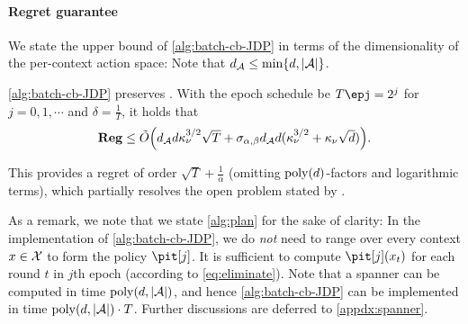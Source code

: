 



\paragraph{Regret guarantee}
We state the upper bound of \cref{alg:batch-cb-JDP} in terms of the dimensionality of the per-context action space: 
Note that $d_{\mathcal{A}}\leq \min\{d,|\mathcal{A}|\}$.

\begin{theorem}\label{thm:regret-upper-JDP}
\cref{alg:batch-cb-JDP} preserves \aJDP. With the epoch schedule be $T\epj=2^j$ for $j=0,1,\cdots$ and $\delta=\frac{1}{T}$, it holds that
\begin{align*}
\textstyle
    \mathbf{Reg}\leq \tilde{O}{\left( d_{\mathcal{A}} d \kappa_\nu^{3/2} \sqrt{T} + \sigma_{\alpha,\beta} d_{\mathcal{A}} d(\kappa_\nu^{3/2}+\kappa_\nu\sqrt{d}) \right)}.
\end{align*}
\end{theorem}
\vspace{-10pt}
This provides a regret of order $\sqrt{T}+\frac{1}{\alpha}$ (omitting $\mathrm{poly}(d)$-factors and logarithmic terms), which partially resolves the open problem stated by \citet{azize2024open}.

As a remark, we note that we state \cref{alg:plan} for the sake of clarity: In the implementation of \cref{alg:batch-cb-JDP}, we do \emph{not} need to range over every context $x\in\mathcal{X}$ to form the policy $\pit[j]$. It is sufficient to compute $\pit[j](x_t)$ for each round $t$ in $j$th epoch (according to \eqref{eq:eliminate}). Note that a spanner can be computed in time $\mathrm{poly}(d,|\mathcal{A}|)$, and hence
\cref{alg:batch-cb-JDP} can be implemented in time $\mathrm{poly}(d,|\mathcal{A}|)\cdot T$. Further discussions are deferred to \cref{appdx:spanner}.

